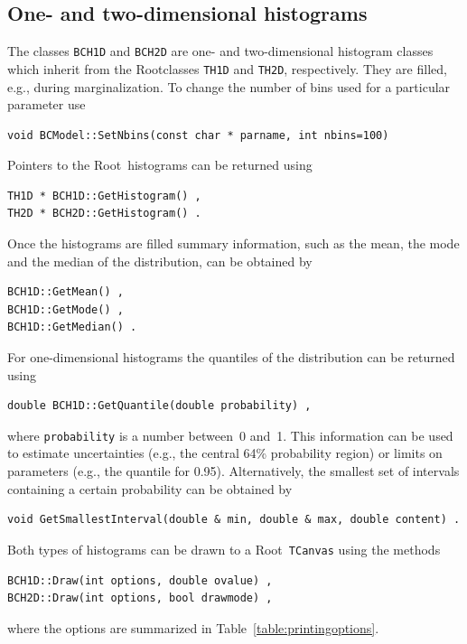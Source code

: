 \documentclass[11pt, a4paper]{article}
\newcommand{\Root}{{\sc Root}}
\begin{document}

\subsection{One- and two-dimensional histograms}

The classes \verb|BCH1D| and \verb|BCH2D| are one- and two-dimensional
histogram classes which inherit from the \Root\-classes \verb|TH1D|
and \verb|TH2D|, respectively. They are filled, e.g., during
marginalization. To change the number of bins used for a particular parameter
use
%
\begin{verbatim}
void BCModel::SetNbins(const char * parname, int nbins=100)
\end{verbatim}
%
Pointers to the \Root\ histograms can be returned
using
%
\begin{verbatim}
TH1D * BCH1D::GetHistogram() ,
TH2D * BCH2D::GetHistogram() .
\end{verbatim}
%
Once the histograms are filled summary information, such as the mean,
the mode and the median of the distribution, can be obtained by
%
\begin{verbatim}
BCH1D::GetMean() ,
BCH1D::GetMode() ,
BCH1D::GetMedian() .
\end{verbatim}
%
For one-dimensional histograms the quantiles of the distribution can
be returned using
%
\begin{verbatim}
double BCH1D::GetQuantile(double probability) ,
\end{verbatim}
%
where \verb|probability| is a number between~0 and~1. This information
can be used to estimate uncertainties (e.g., the central 64\%
probability region) or limits on parameters (e.g., the quantile for
0.95). Alternatively, the smallest set of intervals containing a
certain probability can be obtained by
%
\begin{verbatim}
void GetSmallestInterval(double & min, double & max, double content) .
\end{verbatim}

\noindent
Both types of histograms can be drawn to a \Root\ \verb|TCanvas| using
the methods
%
\begin{verbatim}
BCH1D::Draw(int options, double ovalue) ,
BCH2D::Draw(int options, bool drawmode) ,
\end{verbatim}
%
where the options are summarized in Table~\ref{table:printingoptions}.
\end{document}
